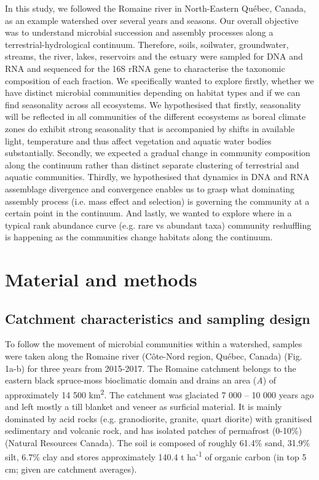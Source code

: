 \documentclass[12pt,a4paper]{article} %
\begin{document}
In this study, we followed the Romaine river in North-Eastern Qu\'{e}bec, Canada, as an example watershed over several years and seasons. Our overall objective was to understand microbial succession and assembly processes along a terrestrial-hydrological continuum. Therefore, soils, soilwater, groundwater, streams, the river, lakes, reservoirs and the estuary were sampled for DNA and RNA and sequenced for the 16S rRNA gene to characterise the taxonomic composition of each fraction. We specifically wanted to explore firstly, whether we have distinct microbial communities depending on habitat types and if we can find seasonality across all ecosystems. We hypothesised that firstly, seasonality will be reflected in all communities of the different ecosystems as boreal climate zones do exhibit strong seasonality that is accompanied by shifts in available light, temperature and thus affect vegetation and aquatic water bodies substantially. Secondly, we expected a gradual change in community composition along the continuum rather than distinct separate clustering of terrestrial and aquatic communities. Thirdly, we hypothesised that dynamics in DNA and RNA assemblage divergence and convergence enables us to grasp what dominating assembly process (i.e. mass effect and selection) is governing the community at a certain point in the continuum. And lastly, we wanted to explore where in a typical rank abundance curve (e.g. rare vs abundant taxa) community reshuffling is happening as the communities change habitats along the continuum.

\section*{Material and methods}
\subsection*{Catchment characteristics and sampling design}
To follow the movement of microbial communities within a watershed, samples were taken along the Romaine river (C\^{o}te-Nord region, Qu\'{e}bec, Canada) (Fig. 1a-b) for three years from 2015-2017. The Romaine catchment belongs to the eastern black spruce-moss bioclimatic domain and drains an area (\textit{A}) of approximately 14 500 km\textsuperscript{2}. The catchment was glaciated 7 000 – 10 000 years ago and left mostly a till blanket and veneer as surficial material. It is mainly dominated by acid rocks (e.g. granodiorite, granite, quart diorite) with granitised sedimentary and volcanic rock, and has isolated patches of permafrost (0-10\%)(Natural Resources Canada). The soil is composed of roughly 61.4\% sand, 31.9\% silt, 6.7\% clay and stores approximately 140.4 t ha\textsuperscript{-1} of organic carbon (in top 5 cm; given are catchment averages)\citep{Lehner2013, Hengl2014}.
\end{document}
